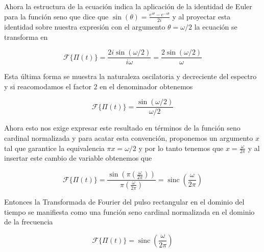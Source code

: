 Ahora la estructura de la ecuación indica la aplicación de la identidad de Euler para la función seno que dice que $\sin(\theta) = \frac{e^{i\theta} - e^{-i\theta}}{2i}$ y al proyectar esta identidad sobre nuestra expresión con el argumento $\theta = \omega/2$ la ecuación se transforma en

\begin{equation}
    \mathcal{F}\{\Pi(t)\} = \frac{2i \sin(\omega/2)}{i\omega} = \frac{2 \sin(\omega/2)}{\omega}
\end{equation}

Esta última forma se muestra la naturaleza oscilatoria y decreciente del espectro y si reacomodamos el factor $2$ en el denominador obtenemos

\begin{equation}
    \mathcal{F}\{\Pi(t)\} = \frac{\sin(\omega/2)}{\omega/2}
\end{equation}

Ahora esto nos exige expresar este resultado en términos de la función seno cardinal normalizada y para acatar esta convención, proponemos un argumento $x$ tal que garantice la equivalencia $\pi x = \omega / 2$ y por lo tanto tenemos que $x = \frac{\omega}{2\pi}$ y al insertar este cambio de variable obtenemos que

\begin{equation}
    \mathcal{F}\{\Pi(t)\} = \frac{\sin\left(\pi \left(\frac{\omega}{2\pi}\right)\right)}{\pi \left(\frac{\omega}{2\pi}\right)} = \operatorname{sinc}\left(\frac{\omega}{2\pi}\right)
\end{equation}

Entonces la Transformada de Fourier del pulso rectangular en el dominio del tiempo se manifiesta como una función seno cardinal normalizada en el dominio de la frecuencia

\begin{equation}
    \mathcal{F}\{\Pi(t)\} = \operatorname{sinc}\left(\frac{\omega}{2\pi}\right)
\end{equation}
